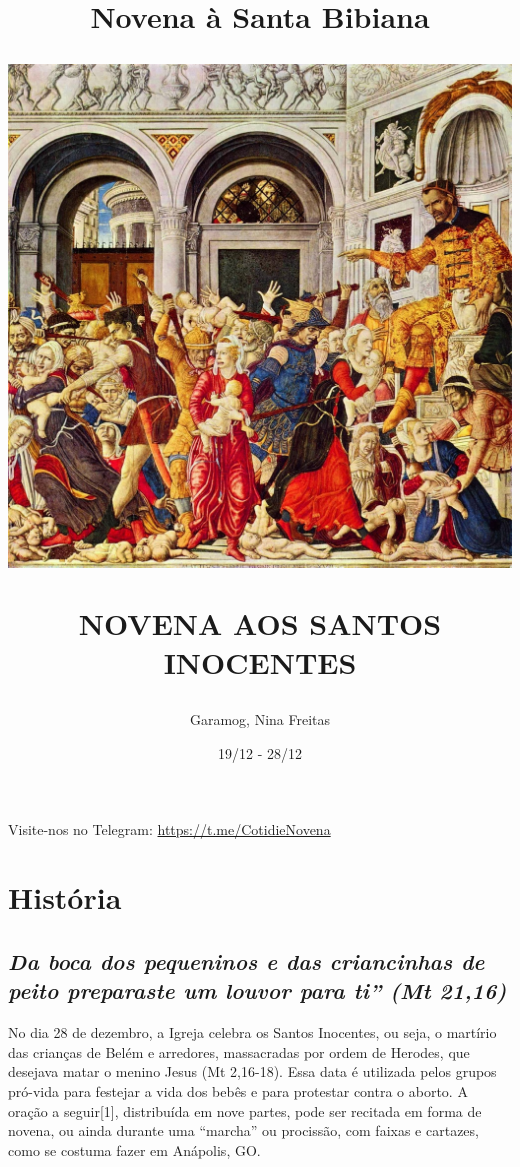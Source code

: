 \documentclass[11pt]{article}
\title{Novena à Santa Bibiana}
\title{
  \includegraphics[scale=0.22]{./assets/imagem.jpg}
  \par
   NOVENA AOS SANTOS INOCENTES}
\author{Garamog, Nina Freitas}
\date{19/12 - 28/12}
\begin{document}
\maketitle

\thispagestyle{empty}

\pagestyle{fancy}
\fancyhf{} %

\fancyfoot[R]{\thepage}
  
\newpage

\tableofcontents

\centering
\vfill
Visite-nos no Telegram: \url{https://t.me/CotidieNovena}
\newpage


\section{História}
\subsection*{\emph{Da boca dos pequeninos e das criancinhas de peito preparaste um louvor para ti” (Mt 21,16)}}\emph{}

\begin{justify}
No dia 28 de dezembro, a Igreja celebra os Santos Inocentes, ou seja, o martírio das crianças de Belém e arredores, massacradas por ordem de Herodes, que desejava matar o menino Jesus (Mt 2,16-18). Essa data é utilizada pelos grupos pró-vida para festejar a vida dos bebês e para protestar contra o aborto. A oração a seguir[1], distribuída em nove partes, pode ser recitada em forma de novena, ou ainda durante uma “marcha” ou procissão, com faixas e cartazes, como se costuma fazer em Anápolis, GO.
\end{justify}
\newpage
\end{document}
